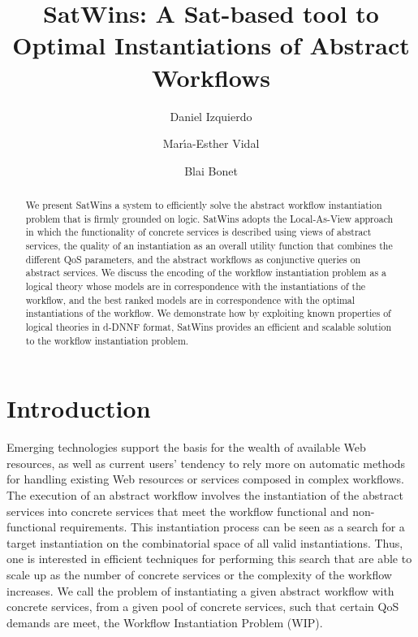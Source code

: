 \documentclass{llncs}
\begin{document}
\allowdisplaybreaks
\title{SatWins: A Sat-based tool to Optimal Instantiations of Abstract Workflows}
\author{Daniel Izquierdo \and Mar\'{\i}a-Esther Vidal \and Blai Bonet}
\maketitle

\begin{abstract}
We present SatWins a system to efficiently solve the abstract workflow
instantiation problem that is firmly grounded on logic.
SatWins adopts the Local-As-View approach in which
the functionality of concrete services is described using views
of abstract services, the quality of an instantiation as an
overall utility function that combines the different QoS parameters,
and the abstract workflows as conjunctive queries on abstract services.
We discuss the encoding of the workflow instantiation problem as a logical theory whose models
are in correspondence with the instantiations of the workflow,
and the best ranked models are in correspondence with the
optimal instantiations of the workflow. We demonstrate how by exploiting known properties of logical theories in 
d-DNNF format, SatWins provides an efficient and scalable solution
to the workflow instantiation problem. 
\end{abstract}

\section{Introduction}
Emerging technologies support the basis for the wealth of available Web resources, as well as current users' tendency to rely more on automatic methods for handling existing Web resources or services composed in complex workflows. The execution of an abstract workflow involves the instantiation
of the abstract services into concrete services that meet the workflow
functional and non-functional requirements. This instantiation
process can be seen as a search for a target instantiation on
the combinatorial space of all valid instantiations.
Thus, one is interested in efficient techniques for performing
this search that are able to scale up as the number of concrete
services or the complexity of the workflow increases. We call the problem of instantiating a given abstract workflow with concrete services, from a given pool of concrete services,
such that certain QoS demands are meet, the Workflow Instantiation
Problem (WIP). 
\end{document}
